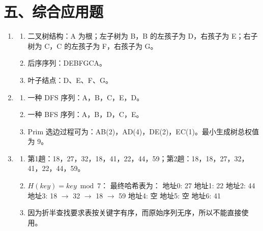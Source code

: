 \documentclass{../../note}
\begin{document}
\section*{五、综合应用题}

\begin{enumerate}[itemsep=1em]
\item
\begin{enumerate}[label=(\arabic*)]
\item 二叉树结构：A 为根；左子树为 B，B 的左孩子为 D，右孩子为 E；右子树为 C，C 的左孩子为 F，右孩子为 G。
\item 后序序列：DEBFGCA。
\item 叶子结点：D、E、F、G。
\end{enumerate}

\item
\begin{enumerate}[label=(\arabic*)]
\item 一种 DFS 序列：A，B，C，E，D。
\item 一种 BFS 序列：A，B，D，C，E。
\item Prim 选边过程可为：AB(2)，AD(4)，DE(2)，EC(1)。最小生成树总权值为 9。
\end{enumerate}

\item
\begin{enumerate}[label=(\arabic*)]
\item 第1趟：18，27，32，18，41，22，44，59；第2趟：18，18，27，32，41，22，44，59。
\item $H(key)=key\bmod 7$：\newline
最终哈希表为：\newline
地址0: 27\newline
地址1: 22\newline
地址2: 44\newline
地址3: 18 $\rightarrow$ 32 $\rightarrow$ 18 $\rightarrow$ 59\newline
地址4: 空\newline
地址5: 空\newline
地址6: 41
\item 因为折半查找要求表按关键字有序，而原始序列无序，所以不能直接使用。
\end{enumerate}
\end{enumerate}
\end{document}
